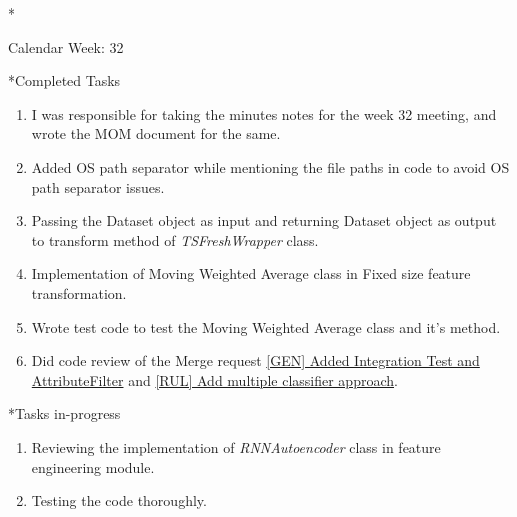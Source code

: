 \documentclass[11pt,a4paper]{article}
\begin{document}
\newpage
\begin{section}*{Calendar Week: 32 \hfill \date{13 August, 2021}}
 \begin{subsection}*{Completed Tasks}
     \begin{enumerate}
         \item I was responsible for taking the minutes notes for the week 32 meeting, and wrote the MOM document for the same.
         \item Added OS path separator while mentioning the file paths in code to avoid OS path separator issues.
         \item Passing the Dataset object as input and returning Dataset object as output to transform method of \textit{TSFreshWrapper} class.
         \item Implementation of Moving Weighted Average class in Fixed size feature transformation.
         \item Wrote test code to test the Moving Weighted Average class and it's method.
         \item Did code review of the Merge request \href{https://git.cs.uni-paderborn.de/machine-learning-for-predictive-maintenance/code/-/merge_requests/29}{[GEN] Added Integration Test and AttributeFilter} and \href{https://git.cs.uni-paderborn.de/machine-learning-for-predictive-maintenance/code/-/merge_requests/27}{[RUL] Add multiple classifier approach}.
     \end{enumerate}
 \end{subsection}
 \begin{subsection}*{Tasks in-progress}
     \begin{enumerate}
         \item Reviewing the implementation of \textit{RNNAutoencoder} class in feature engineering module.
         \item Testing the code thoroughly.
     \end{enumerate}
 \end{subsection}
\end{section}
\end{document}
